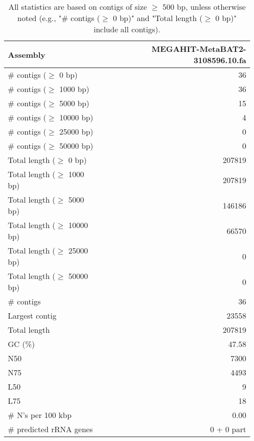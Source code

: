 \documentclass[12pt,a4paper]{article}
\begin{document}
\begin{table}[ht]
\begin{center}
\caption{All statistics are based on contigs of size $\geq$ 500 bp, unless otherwise noted (e.g., "\# contigs ($\geq$ 0 bp)" and "Total length ($\geq$ 0 bp)" include all contigs).}
\begin{tabular}{|l*{1}{|r}|}
\hline
Assembly & MEGAHIT-MetaBAT2-3108596.10.fa \\ \hline
\# contigs ($\geq$ 0 bp) & 36 \\ \hline
\# contigs ($\geq$ 1000 bp) & 36 \\ \hline
\# contigs ($\geq$ 5000 bp) & 15 \\ \hline
\# contigs ($\geq$ 10000 bp) & 4 \\ \hline
\# contigs ($\geq$ 25000 bp) & 0 \\ \hline
\# contigs ($\geq$ 50000 bp) & 0 \\ \hline
Total length ($\geq$ 0 bp) & 207819 \\ \hline
Total length ($\geq$ 1000 bp) & 207819 \\ \hline
Total length ($\geq$ 5000 bp) & 146186 \\ \hline
Total length ($\geq$ 10000 bp) & 66570 \\ \hline
Total length ($\geq$ 25000 bp) & 0 \\ \hline
Total length ($\geq$ 50000 bp) & 0 \\ \hline
\# contigs & 36 \\ \hline
Largest contig & 23558 \\ \hline
Total length & 207819 \\ \hline
GC (\%) & 47.58 \\ \hline
N50 & 7300 \\ \hline
N75 & 4493 \\ \hline
L50 & 9 \\ \hline
L75 & 18 \\ \hline
\# N's per 100 kbp & 0.00 \\ \hline
\# predicted rRNA genes & 0 + 0 part \\ \hline
\end{tabular}
\end{center}
\end{table}
\end{document}
